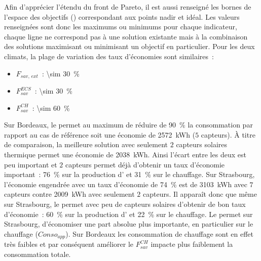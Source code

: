 Afin d’apprécier l’étendu du front de Pareto, il est aussi renseigné les bornes de
l’espace des objectifs () correspondant aux points nadir
et idéal. Les valeurs renseignées sont donc les maximums ou minimums pour chaque
indicateur, chaque ligne ne correspond pas à une solution existante mais à la combinaison
des solutions maximisant ou minimisant un objectif en particulier.
Pour les deux climats, la plage de variation des taux d’économies sont similaires~:
\begin{itemize}
    \item $F_{sav,\, ext}$~: \SI{\sim 30}{\percent}
    \item $F_{sav}^{ECS}$~: \SI{\sim 30}{\percent}
    \item $F_{sav}^{CH}$~: \SI{\sim 60}{\percent}
\end{itemize}
Sur Bordeaux, le  permet au maximum de réduire de
\SI{90}{\percent} la consommation par rapport au cas de référence soit une économie de
\SI{2572}{kWh} ($5$ capteurs). À titre de comparaison, la meilleure solution avec
seulement $2$ capteurs solaires thermique permet une économie de \SI{2038}{kWh}. Ainsi
l’écart entre les deux est peu important et $2$ capteurs permet déjà d’obtenir un taux
d’économie important~: \SI{76}{\percent} sur la production d’ et
\SI{31}{\percent} sur le chauffage. Sur Strasbourg, l’économie engendrée avec un taux
d’économie de \SI{74}{\percent} est de \SI{3103}{kWh} avec $7$ capteurs contre
\SI{2009}{kWh} avec seulement $2$ capteurs. Il apparaît donc que même sur Strasbourg, le
 permet avec peu de capteurs solaires d’obtenir de bon taux d’économie~:
\SI{60}{\percent} sur la production d’ et \SI{22}{\percent} sur le chauffage.
Le  permet sur Strasbourg, d’économiser une part absolue plus importante, en
particulier sur le chauffage ($Conso_{app}$). Sur Bordeaux les consommation de chauffage
sont en effet très faibles et par conséquent améliorer le $F_{sav}^{CH}$ impacte plus
faiblement la consommation totale.

